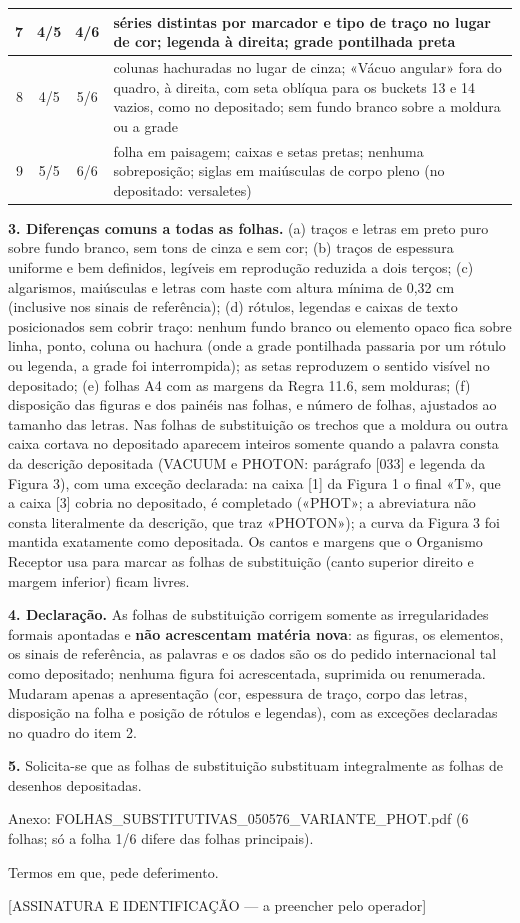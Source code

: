 \documentclass[a4paper,11pt]{article}
\begin{document}
{\begin{longtable}{|r|c|c|p{9.4cm}|}
7 & 4/5 & 4/6 & séries distintas por marcador e tipo de traço no lugar de cor; legenda à direita; grade pontilhada preta\\\hline

8 & 4/5 & 5/6 & colunas hachuradas no lugar de cinza; «Vácuo angular» fora do quadro, à direita, com seta oblíqua para os buckets 13 e 14 vazios, como no depositado; sem fundo branco sobre a moldura ou a grade\\\hline

9 & 5/5 & 6/6 & folha em paisagem; caixas e setas pretas; nenhuma sobreposição; siglas em maiúsculas de corpo pleno (no depositado: versaletes)\\\hline

\end{longtable}}

\textbf{3. Diferenças comuns a todas as folhas.} (a) traços e letras em preto puro sobre fundo branco, sem tons de cinza e sem cor; (b) traços de espessura uniforme e bem definidos, legíveis em reprodução reduzida a dois terços; (c) algarismos, maiúsculas e letras com haste com altura mínima de 0,32 cm (inclusive nos sinais de referência); (d) rótulos, legendas e caixas de texto posicionados sem cobrir traço: nenhum fundo branco ou elemento opaco fica sobre linha, ponto, coluna ou hachura (onde a grade pontilhada passaria por um rótulo ou legenda, a grade foi interrompida); as setas reproduzem o sentido visível no depositado; (e) folhas A4 com as margens da Regra 11.6, sem molduras; (f) disposição das figuras e dos painéis nas folhas, e número de folhas, ajustados ao tamanho das letras. Nas folhas de substituição os trechos que a moldura ou outra caixa cortava no depositado aparecem inteiros somente quando a palavra consta da descrição depositada (VACUUM e PHOTON: parágrafo [033] e legenda da Figura 3), com uma exceção declarada: na caixa [1] da Figura 1 o final «T», que a caixa [3] cobria no depositado, é completado («PHOT»; a abreviatura não consta literalmente da descrição, que traz «PHOTON»); a curva da Figura 3 foi mantida exatamente como depositada. Os cantos e margens que o Organismo Receptor usa para marcar as folhas de substituição (canto superior direito e margem inferior) ficam livres.

\textbf{4. Declaração.} As folhas de substituição corrigem somente as irregularidades formais apontadas e \textbf{não acrescentam matéria nova}: as figuras, os elementos, os sinais de referência, as palavras e os dados são os do pedido internacional tal como depositado; nenhuma figura foi acrescentada, suprimida ou renumerada. Mudaram apenas a apresentação (cor, espessura de traço, corpo das letras, disposição na folha e posição de rótulos e legendas), com as exceções declaradas no quadro do item 2.

\textbf{5.} Solicita-se que as folhas de substituição substituam integralmente as folhas de desenhos depositadas.

Anexo: FOLHAS\_SUBSTITUTIVAS\_050576\_VARIANTE\_PHOT.pdf (6 folhas; só a folha 1/6 difere das folhas principais).

Termos em que, pede deferimento.

\vspace{1.2cm}[ASSINATURA E IDENTIFICAÇÃO --- a preencher pelo operador]
\end{document}
